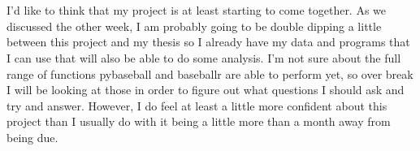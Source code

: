 \documentclass{article}
\begin{document}
\section{}
I'd like to think that my project is at least starting to come together. As we discussed the other week, I am probably going to be double dipping a little between this project and my thesis so I already have my data and programs that I can use that will also be able to do some analysis. I'm not sure about the full range of functions pybaseball and baseballr are able to perform yet, so over break I will be looking at those in order to figure out what questions I should ask and try and answer. However, I do feel at least a little more confident about this project than I usually do with it being a little more than a month away from being due. 
\end{document}
